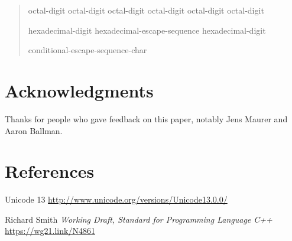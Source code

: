 \documentclass{wg21}
\begin{document}
\begin{quote}
    \begin{bnf}
        \br
        \terminal{\textbackslash} octal-digit\br
        \terminal{\textbackslash} octal-digit octal-digit\br
        \terminal{\textbackslash} octal-digit octal-digit octal-digit\br
    \end{bnf}
    
    \begin{bnf}
        \br
         hexadecimal-digit\br
        hexadecimal-escape-sequence hexadecimal-digit\br
    \end{bnf}
    
    \begin{bnf}
        \br
        \terminal{\textbackslash} conditional-escape-sequence-char
    \end{bnf}
    
\end{quote}

\section{Acknowledgments}

Thanks for people who gave feedback on this paper, notably Jens Maurer and Aaron Ballman.

\section{References}
\renewcommand{\section}[2]{}%



\begin{thebibliography}{9}
    
    
    Unicode 13\newline
    \url{http://www.unicode.org/versions/Unicode13.0.0/}
    
    
    Richard Smith
    \emph{Working Draft, Standard for Programming Language C++}\newline
    \url{https://wg21.link/N4861}
    
\end{thebibliography}
\end{document}
